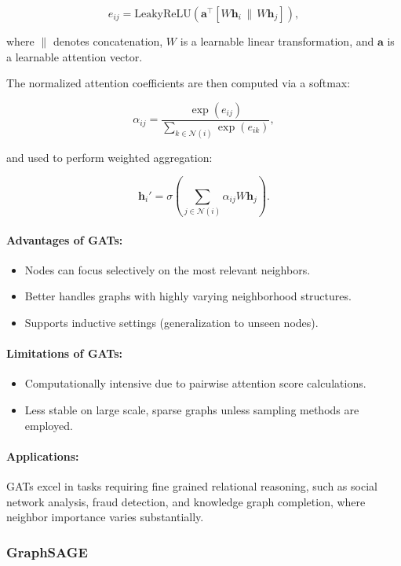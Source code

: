 \documentclass{article}
\begin{document}
\[
e_{ij} = \text{LeakyReLU}\left( \mathbf{a}^\top \left[ W \mathbf{h}_i \, \| \, W \mathbf{h}_j \right] \right),
\]

where \(\|\) denotes concatenation, \(W\) is a learnable linear transformation, and \(\mathbf{a}\) is a learnable attention vector.

The normalized attention coefficients are then computed via a softmax:

\[
\alpha_{ij} = \frac{ \exp(e_{ij}) }{ \sum_{k \in \mathcal{N}(i)} \exp(e_{ik}) },
\]

and used to perform weighted aggregation:

\[
\mathbf{h}_i' = \sigma\left( \sum_{j \in \mathcal{N}(i)} \alpha_{ij} W \mathbf{h}_j \right).
\]

\paragraph{Advantages of GATs:}
\begin{itemize}
    \item Nodes can focus selectively on the most relevant neighbors.
    \item Better handles graphs with highly varying neighborhood structures.
    \item Supports inductive settings (generalization to unseen nodes).
\end{itemize}

\paragraph{Limitations of GATs:}
\begin{itemize}
    \item Computationally intensive due to pairwise attention score calculations.
    \item Less stable on large scale, sparse graphs unless sampling methods are employed.
\end{itemize}

\paragraph{Applications:}
GATs excel in tasks requiring fine grained relational reasoning, such as social network analysis, fraud detection, and knowledge graph completion, where neighbor importance varies substantially.

\subsubsection{GraphSAGE}
\end{document}
